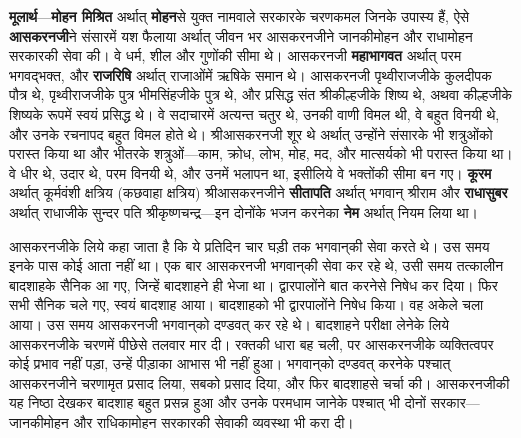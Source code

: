\begin{sloppypar}\justifying{}
\textbf{मूलार्थ}—\textbf{मोहन मिश्रित} अर्थात् \textbf{मोहन}से युक्त नामवाले सरकारके चरणकमल जिनके उपास्य हैं, ऐसे \textbf{आसकरनजी}ने संसारमें यश फैलाया अर्थात् जीवन भर आसकरनजीने जानकीमोहन और राधामोहन सरकारकी सेवा की। वे धर्म, शील और गुणोंकी सीमा थे। आसकरनजी \textbf{महाभागवत} अर्थात् परम भगवद्भक्त, और \textbf{राजरिषि} अर्थात् राजाओंमें ऋषिके समान थे। आसकरनजी पृथ्वीराजजीके कुलदीपक पौत्र थे, पृथ्वीराजजीके पुत्र भीमसिंहजीके पुत्र थे, और प्रसिद्ध संत श्रीकील्हजीके शिष्य थे, अथवा कील्हजीके शिष्यके रूपमें स्वयं प्रसिद्ध थे। वे सदाचारमें अत्यन्त चतुर थे, उनकी वाणी विमल थी, वे बहुत विनयी थे, और उनके रचनापद बहुत विमल होते थे। श्रीआसकरनजी शूर थे अर्थात् उन्होंने संसारके भी शत्रुओंको परास्त किया था और भीतरके शत्रुओं—काम, क्रोध, लोभ, मोह, मद, और मात्सर्यको भी परास्त किया था। वे धीर थे, उदार थे, परम विनयी थे, और उनमें भलापन था, इसीलिये वे भक्तोंकी सीमा बन गए। \textbf{कूरम} अर्थात् कूर्मवंशी क्षत्रिय (कछवाहा क्षत्रिय) श्रीआसकरनजीने \textbf{सीतापति} अर्थात् भगवान् श्रीराम और \textbf{राधासुबर} अर्थात् राधाजीके सुन्दर पति श्रीकृष्ण\-चन्द्र—इन दोनोंके भजन करनेका \textbf{नेम} अर्थात् नियम लिया था।
\end{sloppypar}
\begin{sloppypar}\justifying{}
आसकरनजीके लिये कहा जाता है कि ये प्रतिदिन चार घड़ी तक भगवान्‌की सेवा करते थे। उस समय इनके पास कोई आता नहीं था। एक बार आसकरनजी भगवान्‌की सेवा कर रहे थे, उसी समय तत्कालीन बादशाहके सैनिक आ गए, जिन्हें बादशाहने ही भेजा था। द्वारपालोंने बात करनेसे निषेध कर दिया। फिर सभी सैनिक चले गए, स्वयं बादशाह आया। बादशाहको भी द्वारपालोंने निषेध किया। वह अकेले चला आया। उस समय आसकरनजी भगवान्‌को दण्डवत् कर रहे थे। बादशाहने परीक्षा लेनेके लिये आसकरनजीके चरणमें पीछेसे तलवार मार दी। रक्तकी धारा बह चली, पर आसकरनजीके व्यक्तित्वपर कोई प्रभाव नहीं पड़ा, उन्हें पीड़ाका आभास भी नहीं हुआ। भगवान्‌को दण्डवत् करनेके पश्चात् आसकरनजीने चरणामृत प्रसाद लिया, सबको प्रसाद दिया, और फिर बादशाहसे चर्चा की। आसकरनजीकी यह निष्ठा देखकर बादशाह बहुत प्रसन्न हुआ और उनके परमधाम जानेके पश्चात् भी दोनों सरकार—जानकीमोहन और राधिकामोहन सरकारकी सेवाकी व्यवस्था भी करा दी।
\end{sloppypar}


